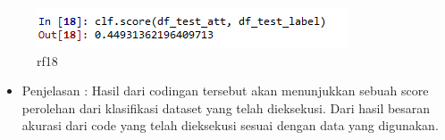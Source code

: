\begin{enumerate}
\begin{itemize}
\begin{figure}[ht]
\includegraphics[scale=0.4]{figures/rf18.png}
\caption{rf18}
\label{contoh}
\end{figure}
\par
\begin{itemize}
\item Penjelasan : Hasil dari codingan tersebut akan menunjukkan sebuah score perolehan dari klasifikasi dataset yang telah dieksekusi. Dari hasil besaran akurasi dari code yang telah dieksekusi sesuai dengan data yang digunakan.
\par
\par
\end{itemize}
\end{itemize}


\end{enumerate}
